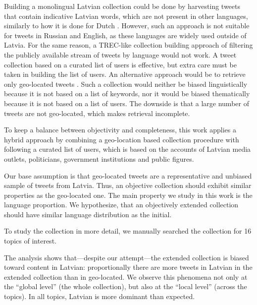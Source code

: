 \documentclass{IOS-Book-Article}
\newcommand{\hl}[1]{#1}
\begin{document}
%
Building a monolingual Latvian collection could be done by harvesting tweets that contain indicative Latvian words, which are not present in other languages, similarly to how it is done for Dutch \cite{sang2013}. However, such an approach is not suitable for tweets in Russian and English, as these languages are widely used outside of Latvia.
%
For the same reason, a TREC-like collection building approach \cite{lin2017rts} of filtering the publicly available stream of tweets by language would not work.
%
A tweet collection based on a curated list of users \cite{SANVICENTE16.465,L14-1642} is effective, but extra care must be taken in building the list of users.
%
An alternative approach would be to retrieve only geo-located tweets \cite{coats_steven_2017,milajevs:2017:BUCC}. Such a collection would neither be biased linguistically because it is not based on a list of keywords, nor it would be biased thematically because it is not based on a list of users. The downside is that a large number of tweets are not geo-located, which makes retrieval incomplete.

To keep a balance between objectivity and completeness, this work applies a hybrid approach by combining a geo-location based collection procedure with following a curated list of users, which is based on the accounts of Latvian media outlets, politicians, government institutions and public figures.

Our base assumption is that geo-located tweets are a representative and unbiased sample of tweets from Latvia. Thus, an objective collection should exhibit similar properties as the geo-located one. The main property we study in this work is the language proportion. We hypothesize, that an objectively extended collection should have similar language distribution as the initial.

To study the collection in more detail, we manually searched the collection for \hl{16} topics of interest.


The analysis shows that---despite our attempt---the extended collection is biased toward content in Latvian: proportionally there are more tweets in Latvian in the extended collection than in geo-located. We observe this phenomena not only at the ``global level'' (the whole collection), but also at the ``local level'' (across the topics). \hl{In all topics, Latvian is more dominant than expected.}
\end{document}
